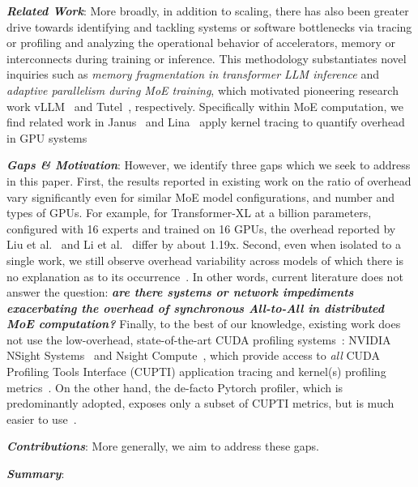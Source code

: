 \textbf{\emph{Related Work}}: More broadly, in addition to scaling, there has also been greater drive towards
identifying and tackling systems or software bottlenecks via tracing or profiling and analyzing the operational behavior of
accelerators, memory or interconnects during training or inference.
This methodology substantiates novel inquiries such as \emph{memory fragmentation in transformer LLM inference}
and \emph{adaptive parallelism during MoE training}, which motivated pioneering research work
vLLM~\cite{kwon2023efficient} and Tutel~\cite{hwang2023tutel}, respectively.
Specifically within MoE computation, we find related work in Janus~\cite{10.1145/3603269.3604869} and
Lina~\cite{288705} apply kernel tracing to quantify \ata overhead in GPU systems

\textbf{\emph{Gaps \& Motivation}}: However, we identify three gaps which we seek to address in this paper.
First, the results reported in existing work on the ratio of \ata overhead vary significantly
even for similar MoE model configurations, and number and types of GPUs. For example, for Transformer-XL
at a billion parameters, configured with 16 experts and trained on 16 GPUs, the overhead reported by
Liu et al.~\cite{10.1145/3603269.3604869} and Li et al.~\cite{288705} differ by about 1.19x.
Second, even when isolated to a single work, we still observe \ata overhead variability across models
of which there is no explanation as to its occurrence~\cite{10.1145/3603269.3604869}.
In other words, current literature does not answer the question: \textbf{\emph{are there systems or network impediments
exacerbating the overhead of synchronous All-to-All in distributed MoE computation?}}
Finally, to the best of our knowledge, existing work does not use the low-overhead,
state-of-the-art CUDA profiling systems~\cite{10.1145/3578244.3583736}: NVIDIA NSight Systems~\cite{nsys} and Nsight Compute~\cite{ncu}, which provide access to \emph{all}
CUDA Profiling Tools Interface (CUPTI) application tracing and kernel(s) profiling metrics~\cite{cupti}.
On the other hand, the de-facto Pytorch profiler, which is predominantly adopted,
exposes only a subset of CUPTI metrics, but is much easier to use~\cite{pytorchProfiler, 10.5555/3454287.3455008}.

\textbf{\emph{Contributions}}: More generally, we aim to address these gaps.

\textbf{\emph{Summary}}:

